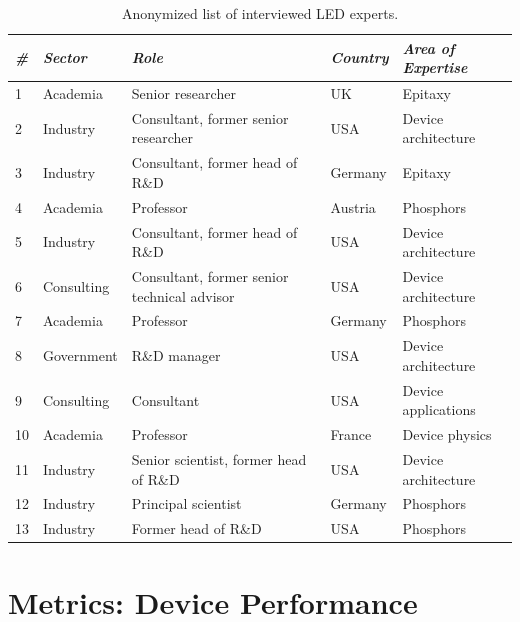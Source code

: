\documentclass[parskip=full]{article}
\begin{document}
\begin{table}[H]
\small
    \centering
    \caption{Anonymized list of interviewed LED experts.}
    \begin{tabular}{|l|l|l|l|l|}
    \hline
        \textit{\#} & \textit{Sector} & \textit{Role} & \textit{Country} & \textit{Area of Expertise} \\ \hline
        1 & Academia & Senior researcher & UK & Epitaxy \\ \hline
        2 & Industry & Consultant, former senior researcher & USA & Device architecture \\ \hline
        3 & Industry & Consultant, former head of R\&D & Germany & Epitaxy \\ \hline
        4 & Academia & Professor & Austria & Phosphors \\ \hline
        5 & Industry & Consultant, former head of R\&D & USA & Device architecture \\ \hline
        6 & Consulting & Consultant, former senior technical advisor & USA & Device architecture \\ \hline
        7 & Academia & Professor & Germany & Phosphors \\ \hline
        8 & Government & R\&D manager & USA & Device architecture \\ \hline
        9 & Consulting & Consultant & USA & Device applications \\ \hline
        10 & Academia & Professor & France & Device physics \\ \hline
        11 & Industry & Senior scientist, former head of R\&D & USA & Device architecture \\ \hline
        12 & Industry & Principal scientist & Germany & Phosphors \\ \hline
        13 & Industry & Former head of R\&D & USA & Phosphors \\ \hline
    \end{tabular}
    \label{tab:interviews}
\end{table}

\clearpage
\section{Metrics: Device Performance}
\label{sec:device_performance_metrics}
\end{document}
